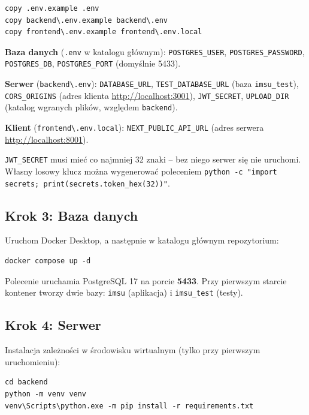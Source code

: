 \begin{lstlisting}
copy .env.example .env
copy backend\.env.example backend\.env
copy frontend\.env.example frontend\.env.local
\end{lstlisting}

\textbf{Baza danych} (\texttt{.env} w katalogu głównym): \texttt{POSTGRES\_USER}, \texttt{POSTGRES\_PASSWORD}, \texttt{POSTGRES\_DB}, \texttt{POSTGRES\_PORT} (domyślnie 5433).

\textbf{Serwer} (\texttt{backend\textbackslash.env}): \texttt{DATABASE\_URL}, \texttt{TEST\_DATABASE\_URL} (baza \texttt{imsu\_test}), \texttt{CORS\_ORIGINS} (adres klienta \url{http://localhost:3001}), \texttt{JWT\_SECRET}, \texttt{UPLOAD\_DIR} (katalog wgranych plików, względem \texttt{backend}).

\textbf{Klient} (\texttt{frontend\textbackslash.env.local}): \texttt{NEXT\_PUBLIC\_API\_URL} (adres serwera \url{http://localhost:8001}).

\begin{tcolorbox}[colback=yellow!10!white,colframe=orange!75!black,title=\faExclamationTriangle\ Klucz JWT]
\texttt{JWT\_SECRET} musi mieć co najmniej 32 znaki -- bez niego serwer się nie uruchomi. Własny losowy klucz można wygenerować poleceniem \verb|python -c "import secrets; print(secrets.token_hex(32))"|.
\end{tcolorbox}

\subsection{Krok 3: Baza danych}

Uruchom Docker Desktop, a następnie w katalogu głównym repozytorium:

\begin{lstlisting}
docker compose up -d
\end{lstlisting}

Polecenie uruchamia PostgreSQL 17 na porcie \textbf{5433}. Przy pierwszym starcie kontener tworzy dwie bazy: \texttt{imsu} (aplikacja) i \texttt{imsu\_test} (testy).

\subsection{Krok 4: Serwer}

Instalacja zależności w środowisku wirtualnym (tylko przy pierwszym uruchomieniu):

\begin{lstlisting}
cd backend
python -m venv venv
venv\Scripts\python.exe -m pip install -r requirements.txt
\end{lstlisting}

